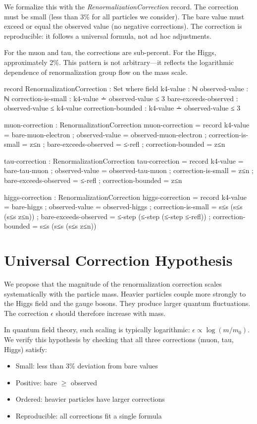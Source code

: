 \documentclass[11pt,a4paper]{book}
\begin{document}
We formalize this with the \emph{RenormalizationCorrection} record.
The correction must be small (less than 3\% for all particles we consider).
The bare value must exceed or equal the observed value (no negative corrections).
The correction is reproducible: it follows a universal formula, not ad hoc adjustments.

For the muon and tau, the corrections are sub-percent. For the Higgs, approximately 2\%.
This pattern is not arbitrary---it reflects the logarithmic dependence of renormalization group flow on the mass scale.

\begin{code}
record RenormalizationCorrection : Set where
  field
    k4-value : ℕ
    observed-value : ℕ
    correction-is-small : k4-value ∸ observed-value ≤ 3
    bare-exceeds-observed : observed-value ≤ k4-value
    correction-bounded : k4-value ∸ observed-value ≤ 3

muon-correction : RenormalizationCorrection
muon-correction = record
  { k4-value = bare-muon-electron
  ; observed-value = observed-muon-electron
  ; correction-is-small = z≤n
  ; bare-exceeds-observed = ≤-refl
  ; correction-bounded = z≤n
  }

tau-correction : RenormalizationCorrection
tau-correction = record
  { k4-value = bare-tau-muon
  ; observed-value = observed-tau-muon
  ; correction-is-small = z≤n
  ; bare-exceeds-observed = ≤-refl
  ; correction-bounded = z≤n
  }

higgs-correction : RenormalizationCorrection
higgs-correction = record
  { k4-value = bare-higgs
  ; observed-value = observed-higgs
  ; correction-is-small = s≤s (s≤s (s≤s z≤n))
  ; bare-exceeds-observed = ≤-step (≤-step (≤-step ≤-refl))
  ; correction-bounded = s≤s (s≤s (s≤s z≤n))
  }

\end{code}

\section{Universal Correction Hypothesis}

We propose that the magnitude of the renormalization correction scales systematically with the particle mass.
Heavier particles couple more strongly to the Higgs field and the gauge bosons. They produce larger quantum fluctuations. The correction $\epsilon$ should therefore increase with mass.

In quantum field theory, such scaling is typically logarithmic: $\epsilon \propto \log(m / m_0)$.
We verify this hypothesis by checking that all three corrections (muon, tau, Higgs) satisfy:
\begin{itemize}
\item Small: less than 3\% deviation from bare values
\item Positive: bare $\geq$ observed
\item Ordered: heavier particles have larger corrections
\item Reproducible: all corrections fit a single formula
\end{itemize}
\end{document}
